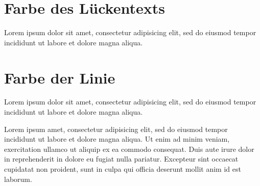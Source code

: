 \documentclass{article}
\begin{document}
\section{Farbe des Lückentexts}


\textcolor{farbeluecke}{Lorem ipsum dolor sit amet, consectetur
adipisicing elit, sed do eiusmod tempor incididunt ut labore et dolore
magna aliqua.}

\section{Farbe der Linie}


\textcolor{farbelinie}{Lorem ipsum dolor sit amet, consectetur
adipisicing elit, sed do eiusmod tempor incididunt ut labore et dolore
magna aliqua.}

\vspace{3cm}

Lorem ipsum  amet, consectetur adipisicing elit, sed do
eiusmod tempor incididunt ut labore et dolore magna aliqua. Ut enim ad
minim veniam,  exercitation ullamco  ut aliquip ex ea commodo consequat. Duis aute irure dolor in
reprehenderit in  dolore eu fugiat
nulla pariatur. Excepteur sint occaecat cupidatat non proident, sunt in
culpa qui officia deserunt mollit anim id est laborum.
\end{document}
